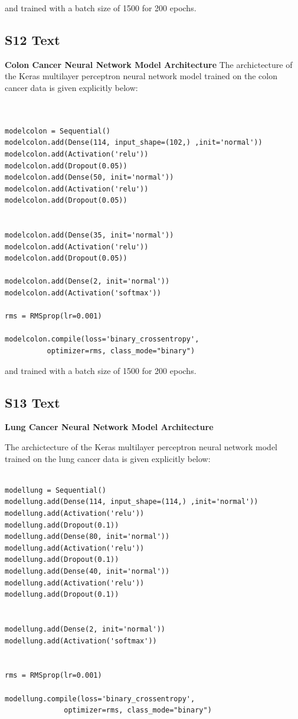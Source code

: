 \documentclass[10pt,letterpaper]{article}
\begin{document}
and trained with a batch size of 1500 for 200 epochs.

\subsection*{S12 Text}
\label{S12_Text}
{\bf Colon Cancer Neural Network Model Architecture}
The archictecture of the Keras multilayer perceptron neural network model 
trained on the colon cancer data is given explicitly below:

\begin{verbatim}


modelcolon = Sequential()
modelcolon.add(Dense(114, input_shape=(102,) ,init='normal'))
modelcolon.add(Activation('relu'))
modelcolon.add(Dropout(0.05))
modelcolon.add(Dense(50, init='normal'))
modelcolon.add(Activation('relu'))
modelcolon.add(Dropout(0.05))


modelcolon.add(Dense(35, init='normal'))
modelcolon.add(Activation('relu'))
modelcolon.add(Dropout(0.05))

modelcolon.add(Dense(2, init='normal'))
modelcolon.add(Activation('softmax'))

rms = RMSprop(lr=0.001)

modelcolon.compile(loss='binary_crossentropy',
          optimizer=rms, class_mode="binary")

\end{verbatim}

and trained with a batch size of 1500 for 200 epochs.


\subsection*{S13 Text}
\label{S13_Text}
{\bf Lung Cancer Neural Network Model Architecture}

The archictecture of the Keras multilayer perceptron neural network model 
trained on the lung cancer data is given explicitly below:

\begin{verbatim}

modellung = Sequential()
modellung.add(Dense(114, input_shape=(114,) ,init='normal'))
modellung.add(Activation('relu'))
modellung.add(Dropout(0.1))
modellung.add(Dense(80, init='normal'))
modellung.add(Activation('relu'))
modellung.add(Dropout(0.1))
modellung.add(Dense(40, init='normal'))
modellung.add(Activation('relu'))
modellung.add(Dropout(0.1))


modellung.add(Dense(2, init='normal'))
modellung.add(Activation('softmax'))


rms = RMSprop(lr=0.001)

modellung.compile(loss='binary_crossentropy',
              optimizer=rms, class_mode="binary")

\end{verbatim}
\end{document}

